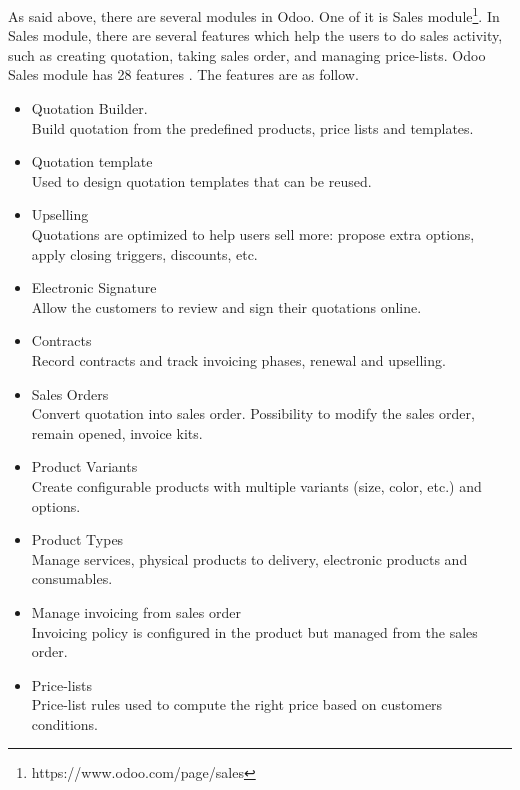 As said above, there are several modules in Odoo. One of it is Sales module\footnote{https://www.odoo.com/page/sales}. In Sales module, there are several features which help the users to do sales activity, such as creating quotation, taking sales order, and managing price-lists. Odoo Sales module has 28 features \citep{web.Odoo.OdooSalesFeatures}. The features are as follow.
\begin{itemize}
	\item Quotation Builder. \\
	Build quotation from the predefined products, price lists and templates.
	
	\item Quotation template \\
	Used to design quotation templates that can be reused.
	
	\item Upselling \\
	Quotations are optimized to help users sell more: propose extra options, apply closing triggers, discounts, etc.
	
	\item Electronic Signature \\
	Allow the customers to review and sign their quotations online.
	
	\item Contracts \\
	Record contracts and track invoicing phases, renewal and upselling.
	
	\item Sales Orders \\
	Convert quotation into sales order. Possibility to modify the sales order, remain opened, invoice kits. 
	
	\item Product Variants \\
	Create configurable products with multiple variants (size, color, etc.) and options.
	
	\item Product Types \\
	Manage services, physical products to delivery, electronic products and consumables.
	
	\item Manage invoicing from sales order \\
	Invoicing policy is configured in the product but managed from the sales order.
	
	\item Price-lists \\
	Price-list rules used to compute the right price based on customers conditions. 
	

\end{itemize}
